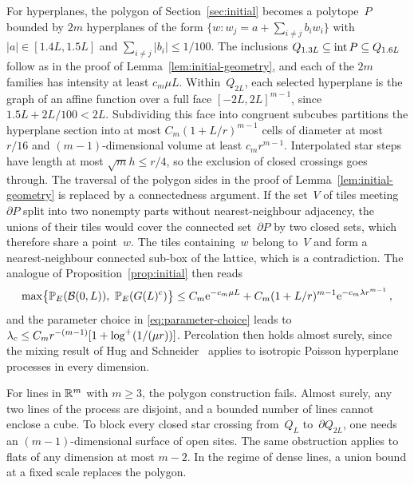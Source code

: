 \documentclass[11pt,letterpaper]{article}
\begin{document}
\begin{remark}
\label{rem:hyperplanes}
For hyperplanes, the polygon of Section~\ref{sec:initial} becomes a polytope~$P$ bounded by $2m$ hyperplanes of the form $\{w\colon w_j=a+\sum_{i\neq j}b_iw_i\}$ with $\lvert a\rvert\in[1.4L,1.5L]$ and $\sum_{i\neq j}\lvert b_i\rvert\le1/100$. The inclusions $Q_{1.3L}\subseteq\operatorname{int} P\subseteq Q_{1.6L}$ follow as in the proof of Lemma~\ref{lem:initial-geometry}, and each of the $2m$ families has intensity at least $c_m\mu L$. Within~$Q_{2L}$, each selected hyperplane is the graph of an affine function over a full face $[-2L,2L]^{m-1}$, since $1.5L+2L/100<2L$. Subdividing this face into congruent subcubes partitions the hyperplane section into at most $C_m(1+L/r)^{m-1}$ cells of diameter at most~$r/16$ and $(m-1)$-dimensional volume at least $c_mr^{m-1}$. Interpolated star steps have length at most $\sqrt mh\le r/4$, so the exclusion of closed crossings goes through. The traversal of the polygon sides in the proof of Lemma~\ref{lem:initial-geometry} is replaced by a connectedness argument. If the set~$V$ of tiles meeting~$\partial P$ split into two nonempty parts without nearest-neighbour adjacency, the unions of their tiles would cover the connected set~$\partial P$ by two closed sets, which therefore share a point~$w$. The tiles containing~$w$ belong to~$V$ and form a nearest-neighbour connected sub-box of the lattice, which is a contradiction. The analogue of Proposition~\ref{prop:initial} then reads
\begin{equation*}
  \max\bigl\{\P_E(\cB(0,L)),\ \P_E(G(L)^\c)\bigr\}\le C_m\e^{-c_m\mu L}+C_m(1+L/r)^{m-1}\e^{-c_m\lambda r^{m-1}}\,,
\end{equation*}
and the parameter choice in \eqref{eq:parameter-choice} leads to $\lambda_c\le C_mr^{-(m-1)}[1+\log^{+}(1/(\mu r))]$. Percolation then holds almost surely, since the mixing result of Hug and Schneider~\cite[Theorem~7.1.4]{HS24} applies to isotropic Poisson hyperplane processes in every dimension.
\end{remark}

For lines in $\mathbb R^m$ with $m\ge3$, the polygon construction fails. Almost surely, any two lines of the process are disjoint, and a bounded number of lines cannot enclose a cube. To block every closed star crossing from~$Q_L$ to~$\partial Q_{2L}$, one needs an $(m-1)$-dimensional surface of open sites. The same obstruction applies to flats of any dimension at most $m-2$. In the regime of dense lines, a union bound at a fixed scale replaces the polygon.
\end{document}
